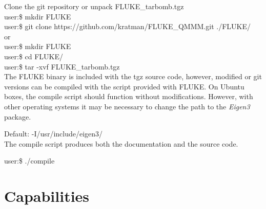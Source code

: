 \documentclass[12pt]{report}
\begin{document}
Clone the git repository or unpack FLUKE\_tarbomb.tgz \\

user:\$ mkdir FLUKE \\
user:\$ git clone https://github.com/kratman/FLUKE\_QMMM.git ./FLUKE/ \\

or \\

user:\$ mkdir FLUKE \\
user:\$ cd FLUKE/ \\
user:\$ tar -xvf FLUKE\_tarbomb.tgz \\

The FLUKE binary is included with the tgz source code, however, modified or
git versions can be compiled with the script provided with FLUKE. On Ubuntu
boxes, the compile script should function without modifications. However, with
other operating systems it may be necessary to change the path to the
\textit{Eigen3} package.

Default: -I/usr/include/eigen3/ \\

The compile script produces both the documentation and the source code.

user:\$ ./compile

\section{Capabilities}
\end{document}
